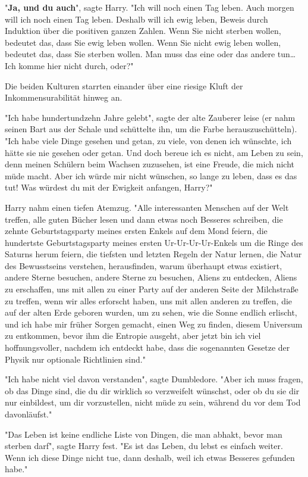 {"\textbf{Ja, und du auch}", sagte Harry. "Ich will noch einen Tag leben. Auch morgen will ich noch einen Tag leben. Deshalb will ich ewig leben, Beweis durch Induktion über die positiven ganzen Zahlen. Wenn Sie nicht sterben wollen, bedeutet das, dass Sie ewig leben wollen. Wenn Sie nicht ewig leben wollen, bedeutet das, dass Sie sterben wollen. Man muss das eine oder das andere tun… Ich komme hier nicht durch, oder?"

Die beiden Kulturen starrten einander über eine riesige Kluft der Inkommensurabilität hinweg an.

"Ich habe hundertundzehn Jahre gelebt", sagte der alte Zauberer leise (er nahm seinen Bart aus der Schale und schüttelte ihn, um die Farbe herauszuschütteln). "Ich habe viele Dinge gesehen und getan, zu viele, von denen ich wünschte, ich hätte sie nie gesehen oder getan. Und doch bereue ich es nicht, am Leben zu sein, denn meinen Schülern beim Wachsen zuzusehen, ist eine Freude, die mich nicht müde macht. Aber ich würde mir nicht wünschen, so lange zu leben, dass es das tut! Was würdest du mit der Ewigkeit anfangen, Harry?"

Harry nahm einen tiefen Atemzug. "Alle interessanten Menschen auf der Welt treffen, alle guten Bücher lesen und dann etwas noch Besseres schreiben, die zehnte Geburtstagsparty meines ersten Enkels auf dem Mond feiern, die hundertste Geburtstagsparty meines ersten Ur-Ur-Ur-Ur-Enkels um die Ringe des Saturns herum feiern, die tiefsten und letzten Regeln der Natur lernen, die Natur des Bewusstseins verstehen, herausfinden, warum überhaupt etwas existiert, andere Sterne besuchen, andere Sterne zu besuchen, Aliens zu entdecken, Aliens zu erschaffen, uns mit allen zu einer Party auf der anderen Seite der Milchstraße zu treffen, wenn wir alles erforscht haben, uns mit allen anderen zu treffen, die auf der alten Erde geboren wurden, um zu sehen, wie die Sonne endlich erlischt, und ich habe mir früher Sorgen gemacht, einen Weg zu finden, diesem Universum zu entkommen, bevor ihm die Entropie ausgeht, aber jetzt bin ich viel hoffnungsvoller, nachdem ich entdeckt habe, dass die sogenannten Gesetze der Physik nur optionale Richtlinien sind."

"Ich habe nicht viel davon verstanden", sagte Dumbledore. "Aber ich muss fragen, ob das Dinge sind, die du dir wirklich so verzweifelt wünschst, oder ob du sie dir nur einbildest, um dir vorzustellen, nicht müde zu sein, während du vor dem Tod davonläufst."

"Das Leben ist keine endliche Liste von Dingen, die man abhakt, bevor man sterben darf", sagte Harry fest. "Es ist das Leben, du lebst es einfach weiter. Wenn ich diese Dinge nicht tue, dann deshalb, weil ich etwas Besseres gefunden habe."

}
